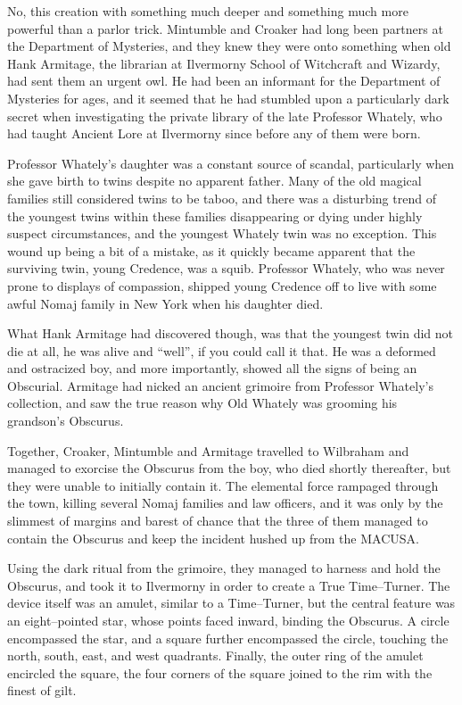 No, this creation with something much deeper and something much more powerful than a parlor trick. Mintumble and Croaker had long been partners at the Department of Mysteries, and they knew they were onto something when old Hank Armitage, the librarian at Ilvermorny School of Witchcraft and Wizardy, had sent them an urgent owl. He had been an informant for the Department of Mysteries for ages, and it seemed that he had stumbled upon a particularly dark secret when investigating the private library of the late Professor Whately, who had taught Ancient Lore at Ilvermorny since before any of them were born.

Professor Whately’s daughter was a constant source of scandal, particularly when she gave birth to twins despite no apparent father. Many of the old magical families still considered twins to be taboo, and there was a disturbing trend of the youngest twins within these families disappearing or dying under highly suspect circumstances, and the youngest Whately twin was no exception. This wound up being a bit of a mistake, as it quickly became apparent that the surviving twin, young Credence, was a squib. Professor Whately, who was never prone to displays of compassion, shipped young Credence off to live with some awful Nomaj family in New York when his daughter died.

What Hank Armitage had discovered though, was that the youngest twin did not die at all, he was alive and “well”, if you could call it that. He was a deformed and ostracized boy, and more importantly, showed all the signs of being an Obscurial. Armitage had nicked an ancient grimoire from Professor Whately’s collection, and saw the true reason why Old Whately was grooming his grandson’s Obscurus.

Together, Croaker, Mintumble and Armitage travelled to Wilbraham and managed to exorcise the Obscurus from the boy, who died shortly thereafter, but they were unable to initially contain it. The elemental force rampaged through the town, killing several Nomaj families and law officers, and it was only by the slimmest of margins and barest of chance that the three of them managed to contain the Obscurus and keep the incident hushed up from the MACUSA.

Using the dark ritual from the grimoire, they managed to harness and hold the Obscurus, and took it to Ilvermorny in order to create a True Time\mbox{--}Turner. The device itself was an amulet, similar to a Time\mbox{--}Turner, but the central feature was an eight\mbox{--}pointed star, whose points faced inward, binding the Obscurus. A circle encompassed the star, and a square further encompassed the circle, touching the north, south, east, and west quadrants. Finally, the outer ring of the amulet encircled the square, the four corners of the square joined to the rim with the finest of gilt.

